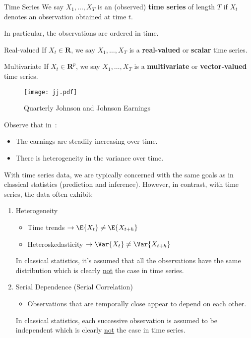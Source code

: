 \begin{Definition}{Time Series}{}
    We say $ X_1,\ldots,X_T $ is an (observed)
    \textbf{time series} of length $ T $ if $ X_t $
    denotes an observation obtained at time $ t $.

    In particular, the observations are ordered in time.
\end{Definition}
\begin{Definition}{Real-valued}{}
    If $ X_t\in\mathbf{R} $, we say $ X_1,\ldots,X_T $ is
    a \textbf{real-valued} or \textbf{scalar} time series.
\end{Definition}
\begin{Definition}{Multivariate}{}
    If $ X_t\in\mathbf{R}^p $, we say $ X_1,\ldots,X_T $
    is a \textbf{multivariate} or \textbf{vector-valued}
    time series.
\end{Definition}

\begin{figure}[!ht]
    \centering
    \texttt{[image: jj.pdf]}
    \caption{Quarterly Johnson and Johnson Earnings}\label{fig:jj}
\end{figure}
Observe that in~:
\begin{itemize}
    \item The earnings are steadily increasing over time.
    \item There is heterogeneity in the variance over time.
\end{itemize}

With time series data, we are typically concerned
with the same goals as in classical statistics (prediction and inference).
However, in contrast, with time series, the data often exhibit:
\begin{enumerate}[(1)]
    \item Heterogeneity
          \begin{itemize}
              \item Time trends $ \rightarrow \E{X_t}\neq \E{X_{t+h}} $
              \item Heteroskedasticity
                    $ \rightarrow \Var{X_t}\neq \Var{X_{t+h}} $
          \end{itemize}
          {\color{blue}In classical statistics, it's assumed that all the observations have the
          same distribution which is clearly \underline{not} the case in time series.}
    \item Serial Dependence (Serial Correlation)
          \begin{itemize}
              \item Observations that are temporally close appear to depend
                    on each other.
          \end{itemize}
          {\color{blue}In classical statistics, each successive observation is assumed
          to be independent which is clearly \underline{not} the case in time series.}
\end{enumerate}

